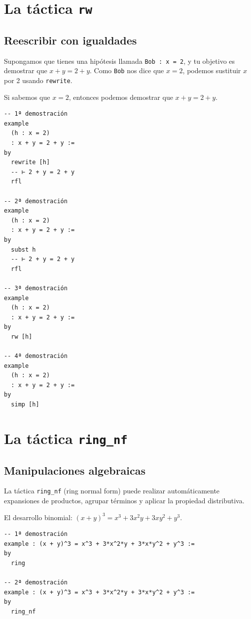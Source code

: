 \section{La táctica \texttt{rw}}

\subsection*{Reescribir con igualdades}

Supongamos que tienes una hipótesis llamada \texttt{Bob : x = 2}, y tu
objetivo es demostrar que $x + y = 2 + y$. Como \texttt{Bob} nos dice
que $x = 2$, podemos sustituir $x$ por 2 usando \texttt{rewrite}.

\begin{theorem}
Si sabemos que $x = 2$, entonces podemos demostrar que $x + y = 2 + y$.
\end{theorem}

\begin{verbatim}
-- 1ª demostración
example
  (h : x = 2)
  : x + y = 2 + y :=
by
  rewrite [h]
  -- ⊢ 2 + y = 2 + y
  rfl

-- 2ª demostración
example
  (h : x = 2)
  : x + y = 2 + y :=
by
  subst h
  -- ⊢ 2 + y = 2 + y
  rfl

-- 3ª demostración
example
  (h : x = 2)
  : x + y = 2 + y :=
by
  rw [h]

-- 4ª demostración
example
  (h : x = 2)
  : x + y = 2 + y :=
by
  simp [h]
\end{verbatim}

\section{La táctica \texttt{ring\_nf}}

\subsection*{Manipulaciones algebraicas}

La táctica \texttt{ring\_nf} (ring normal form) puede realizar
automáticamente expansiones de productos, agrupar términos y aplicar la
propiedad distributiva.

\begin{theorem}
El desarrollo binomial: $(x + y)^3 = x^3 + 3x^2y + 3xy^2 + y^3$.
\end{theorem}

\begin{verbatim}
-- 1ª demostración
example : (x + y)^3 = x^3 + 3*x^2*y + 3*x*y^2 + y^3 :=
by
  ring

-- 2ª demostración
example : (x + y)^3 = x^3 + 3*x^2*y + 3*x*y^2 + y^3 :=
by
  ring_nf
\end{verbatim}

